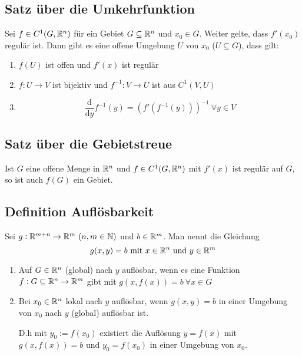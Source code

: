 \subsection{Satz über die Umkehrfunktion}
Sei $f \in C^1(G, \mathbb{R}^n)$ für ein Gebiet $G \subseteq \mathbb{R}^n$ und $x_0 \in G$. Weiter
gelte, dass $f'(x_0)$ regulär ist. Dann gibt es eine offene Umgebung $U$ von $x_0$
($U \subseteq G$), dass gilt:
\begin{enumerate}[label= (\alph*)]
    \item $f(U)$ ist offen und $f'(x)$ ist regulär
    \item $f: U \rightarrow V$ ist bijektiv und $f^{-1}: V \rightarrow U$ ist aus
        $C^1(V, U)$
    \item
        \begin{equation*}
            \frac{\text{d}}{\text{d}y} f^{-1} (y) = {(f'(f^{-1}(y)))}^{-1}
            \ \forall y \in V
        \end{equation*}
\end{enumerate}

\subsection{Satz über die Gebietstreue}
Ist $G$ eine offene Menge in $\mathbb{R}^n$ und $f \in C^1 (G, \mathbb{R}^n)$ mit $f'(x)$
ist regulär auf $G$, so ist auch $f(G)$ ein Gebiet.

\subsection{Definition Auflösbarkeit}
Sei $g: \mathbb{R}^{m + n} \rightarrow \mathbb{R}^m\ (n, m \in \mathbb{N})$ und $b \in \mathbb{R}^m$.
Man nennt die Gleichung
\begin{equation*}
    g(x,y) = b \text{ mit } x \in \mathbb{R}^n \text{ und } y \in \mathbb{R}^m
\end{equation*}
\begin{enumerate}[label= (\alph*)]
    \item Auf $G \in \mathbb{R}^n$ (global) nach $y$ auflösbar, wenn es eine Funktion
        $f: G \subseteq \mathbb{R}^n \rightarrow \mathbb{R}^m$ gibt mit
        $g(x, f(x)) = b\ \forall x \in G$
    \item Bei $x_0 \in \mathbb{R}^n$ lokal nach $y$ auflösbar, wenn $g(x, y) = b$ in
        einer Umgebung von $x_0$ nach $y$ (global) auflösbar ist.

        D.h mit $y_0 := f(x_0)$ existiert die Auflösung $y = f(x)$ mit
        $g(x, f(x))=b$ und $y_0 = f(x_0)$ in einer Umgebung von $x_0$.
\end{enumerate}

